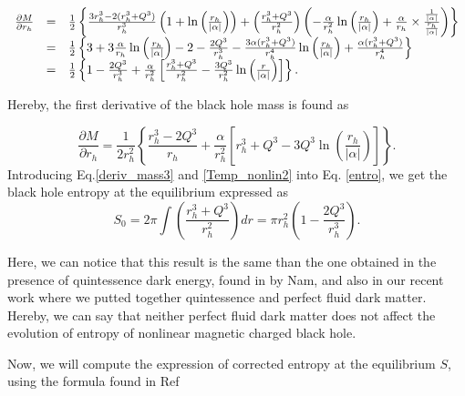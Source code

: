 \documentclass[10pt,letterpaper]{article}
\begin{document}
\begin{eqnarray*}
	\begin{array}{r c l}
		\frac{\partial M}{\partial r_h}&=&\frac{1}{2}\left\{ \frac{3r_h^3-2(r_h^3+Q^3)}{r_h^3}\left(1+\ln\left(\frac{r_h}{|\alpha|}\right)\right)+\left(\frac{r_h^3+Q^3}{r_h^2}\right)\left(-\frac{\alpha}{r_h^2}\ln\left(\frac{r_h}{|\alpha|}\right)+\frac{\alpha}{r_h}\times\frac{\frac{1}{|\alpha|}}{\frac{r_h}{|\alpha|}}\right) \right\}\\
		&=&\frac{1}{2}\left\{3+3\frac{\alpha}{r_h}\ln\left(\frac{r_h}{|\alpha|}\right)-2-\frac{2Q^3}{r_h^3}-\frac{3\alpha(r_h^3+Q^3)}{r_h^4}\ln\left(\frac{r_h}{|\alpha|}\right)+\frac{\alpha(r_h^3+Q^3)}{r_h^4} \right\}\\
		&=&\frac{1}{2}\left\{ 1-\frac{2Q^3}{r_h^3}+\frac{\alpha}{r_h^2}\left[ \frac{r_h^3+Q^3}{r_h^2}-\frac{3Q^3}{r_h^2}\ln\left(\frac{r}{|\alpha|}\right) \right] \right\}.
	\end{array}
\end{eqnarray*}

Hereby, the first derivative of the black hole mass is found as

\begin{equation}\label{deriv_mass3}
\frac{\partial M}{\partial r_h}=\frac{1}{2r_h^2}\left\{ \frac{r_h^3-2Q^3}{r_h}+\frac{\alpha}{r_h^2}\left[ r_h^3+Q^3-3Q^3\ln\left(\frac{r_h}{|\alpha|}\right) \right] \right\}.
\end{equation}
Introducing Eq.\eqref{deriv_mass3} and \eqref{Temp_nonlin2} into Eq. \eqref{entro}, we get the black hole entropy at the equilibrium expressed as
\begin{equation}\label{entro_b}
S_0=2\pi\int\left(\frac{r_h^3+Q^3}{r_h^2}\right)dr=\pi r_h^2\left(1-\frac{2Q^3}{r_h^3}\right).
\end{equation}

Here, we can notice that this result is the same than the one obtained in the presence of quintessence dark energy, found in by Nam\cite{nam2018on}, and also in our recent work where we putted together quintessence and perfect fluid dark matter\cite{ndongmo2023thermodynamics}. Hereby, we can say that neither perfect fluid dark matter does not affect the evolution of entropy of nonlinear magnetic charged black hole.

Now, we will compute the expression of corrected entropy at the equilibrium $S$, using the formula found in Ref \cite{Sudhanshu2022corrected}
\end{document}
